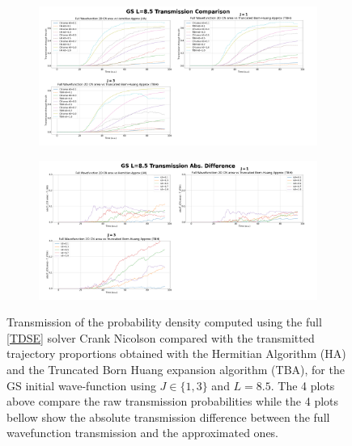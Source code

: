 \documentclass[11pt, a4paper]{article} %
\begin{document}
\begin{figure}[p]
  \centering
  \begin{subfigure}[b]{1.1\linewidth}
    \includegraphics[width=\linewidth]{Example_Results/GS_L_8.5_transmission.png}
  \end{subfigure}
  \begin{subfigure}[b]{1.1\linewidth}
    \includegraphics[width=\linewidth]{Example_Results/GS_L_8.5_errors.png}
  \end{subfigure}

  
  \caption{ Transmission of the probability density computed using the full \ref{TDSE} solver Crank Nicolson compared with the transmitted trajectory proportions obtained with the Hermitian Algorithm (HA) and the Truncated Born Huang expansion algorithm (TBA), for the GS initial wave-function using $J\in\{1,3\}$ and $L=8.5$. The 4 plots above compare the raw transmission probabilities while the 4 plots bellow show the absolute transmission difference between the full wavefunction transmission and the approximated ones. }
  \label{fig:transm_GS_L85}
\end{figure}
\end{document}
